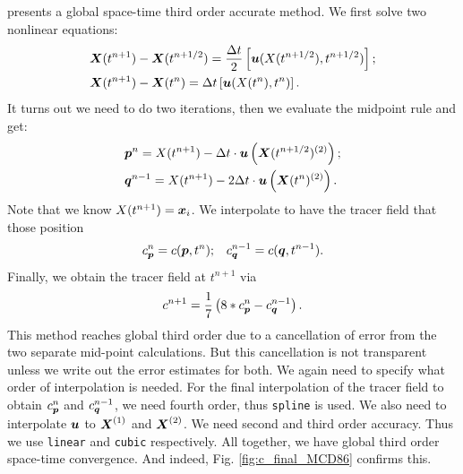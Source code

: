 \documentclass[11pt,letterpaper]{article}
\begin{document}
\cite{mcdonald1987} presents a global space-time third order accurate method. We first solve two nonlinear equations:
\begin{align*}
    &\boldsymbol{X}(t^{n+1})-\boldsymbol{X}(t^{n+1/2}) = \frac{\Delta t}{2}\left[\boldsymbol{u}(X(t^{n+1/2}),t^{n+1/2})\right];\\
    &\boldsymbol{X}(t^{n+1})-\boldsymbol{X}(t^{n}) = {\Delta t}\left[\boldsymbol{u}(X(t^{n}),t^{n})\right].
\end{align*}
It turns out we need to do two iterations, then we evaluate the midpoint rule and get:
\begin{align*}
    &\boldsymbol{p}^{n} = X(t^{n+1})-\Delta t\cdot \boldsymbol{u}\left(\boldsymbol{X}(t^{n+1/2})^{(2)}\right);\\
    &\boldsymbol{q}^{n-1} = X(t^{n+1})-2\Delta t\cdot \boldsymbol{u}\left(\boldsymbol{X}(t^{n})^{(2)}\right).
\end{align*}
Note that we know $X(t^{n+1}) = \boldsymbol{x}_i$. We interpolate to have the tracer field that those position
\begin{align*}
    &c_{\boldsymbol{p}}^n = c(\boldsymbol{p},t^n);
    &c_{\boldsymbol{q}}^{n-1} = c(\boldsymbol{q},t^{n-1}).
\end{align*}
Finally, we obtain the tracer field at $t^{n+1}$ via
\begin{align*}
    c^{n+1} = \frac{1}{7}\left(8*c_{\boldsymbol{p}}^n-c_{\boldsymbol{q}}^{n-1}\right). 
\end{align*}
This method reaches global third order due to a cancellation of error from the two separate mid-point calculations. But this cancellation is not transparent unless we write out the error estimates for both. We again need to specify what order of interpolation is needed. For the final interpolation of the tracer field to obtain $c_{\boldsymbol{p}}^n$ and $c_{\boldsymbol{q}}^{n-1}$, we need fourth order, thus \texttt{spline} is used. We also need to interpolate $\boldsymbol{u}$ to $\boldsymbol{X}^{(1)}$ and $\boldsymbol{X}^{(2)}$. We need second and third order accuracy. Thus we use \texttt{linear} and \texttt{cubic} respectively. All together, we have global third order space-time convergence. And indeed, Fig. \ref{fig:c_final_MCD86} confirms this.
\end{document}
